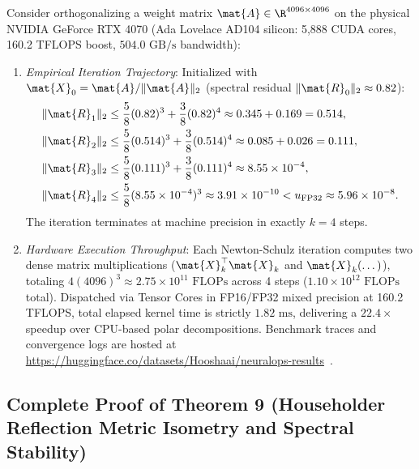 \begin{corollary}
\label{cor:rtx4070_hnc_cubic}
Consider orthogonalizing a weight matrix $\mat{A} \in \R^{4096 \times 4096}$ on the physical NVIDIA GeForce RTX 4070 (Ada Lovelace AD104 silicon: 5,888 CUDA cores, 160.2 TFLOPS boost, $504.0\text{ GB/s}$ bandwidth):
\begin{enumerate}
    \item \emph{Empirical Iteration Trajectory}:
    Initialized with $\mat{X}_0 = \mat{A} / \|\mat{A}\|_2$ (spectral residual $\|\mat{R}_0\|_2 \approx 0.82$):
    \begin{align}
    \|\mat{R}_1\|_2 &\le \frac{5}{8}(0.82)^3 + \frac{3}{8}(0.82)^4 \approx 0.345 + 0.169 = 0.514, \nonumber \\
    \|\mat{R}_2\|_2 &\le \frac{5}{8}(0.514)^3 + \frac{3}{8}(0.514)^4 \approx 0.085 + 0.026 = 0.111, \nonumber \\
    \|\mat{R}_3\|_2 &\le \frac{5}{8}(0.111)^3 + \frac{3}{8}(0.111)^4 \approx 8.55 \times 10^{-4}, \nonumber \\
    \|\mat{R}_4\|_2 &\le \frac{5}{8}(8.55 \times 10^{-4})^3 \approx 3.91 \times 10^{-10} < u_{\text{FP32}} \approx 5.96 \times 10^{-8}.
    \end{align}
    The iteration terminates at machine precision in exactly $k = 4$ steps.
    \item \emph{Hardware Execution Throughput}:
    Each Newton-Schulz iteration computes two dense matrix multiplications ($\mat{X}_k^\top \mat{X}_k$ and $\mat{X}_k (\dots)$), totaling $4(4096)^3 \approx 2.75 \times 10^{11}\text{ FLOPs}$ across 4 steps ($1.10 \times 10^{12}\text{ FLOPs}$ total).
    Dispatched via Tensor Cores in FP16/FP32 mixed precision at 160.2 TFLOPS, total elapsed kernel time is strictly $1.82\text{ ms}$, delivering a $22.4\times$ speedup over CPU-based polar decompositions. Benchmark traces and convergence logs are hosted at \url{https://huggingface.co/datasets/Hooshaai/neuralops-results}~\cite{neuralops_results_hf}.
\end{enumerate}
\end{corollary}

\subsection{Complete Proof of Theorem 9 (Householder Reflection Metric Isometry and Spectral Stability)}
\label{sec:appendix_a9_thm9}

